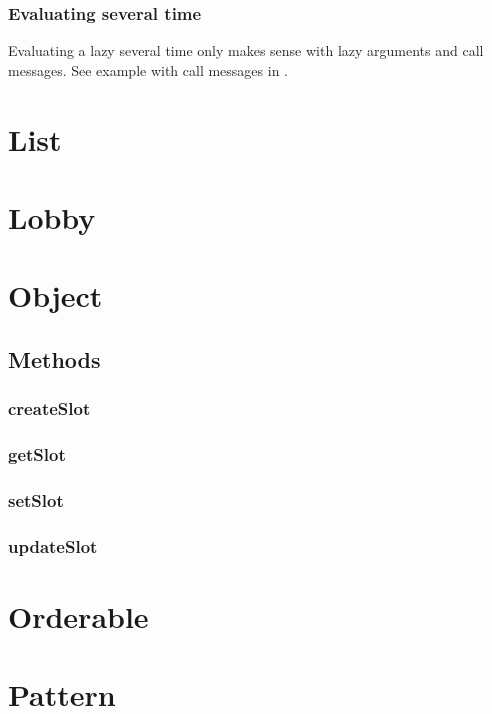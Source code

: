 \documentclass[openright,twoside,12pt]{report}
\begin{document}
\subsubsection{Evaluating several time}

Evaluating a lazy several time only makes sense with lazy arguments
and call messages. See example with call messages in
.

\section{List}


\section{Lobby}
\section{Object}
\label{sect:std-object}

\subsection{Methods}

\subsubsection{createSlot}
\label{sect:std-object-createslot}

\subsubsection{getSlot}
\label{sect:std-object-getslot}

\subsubsection{setSlot}
\label{sect:std-object-setslot}

\subsubsection{updateSlot}
\label{sect:std-object-updateslot}

\section{Orderable}
\label{sect:std-orderable}
\section{Pattern}
\end{document}
